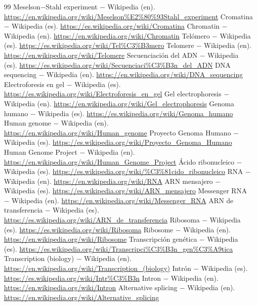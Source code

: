 \documentclass{book}
\begin{document}
\begin{thebibliography}{99}
 Meselson\(-\)Stahl experiment \(-\) Wikipedia (en). \url{https://en.wikipedia.org/wiki/Meselson%E2%80%93Stahl_experiment}
 Cromatina \(-\) Wikipedia (es). \url{https://es.wikipedia.org/wiki/Cromatina}
 Chromatin \(-\) Wikipedia (en). \url{https://en.wikipedia.org/wiki/Chromatin}
 Telómero \(-\) Wikipedia (es). \url{https://es.wikipedia.org/wiki/Tel%C3%B3mero}
 Telomere \(-\) Wikipedia (en). \url{https://en.wikipedia.org/wiki/Telomere}
 Secuenciación del ADN \(-\) Wikipedia (es). \url{https://es.wikipedia.org/wiki/Secuenciaci%C3%B3n_del_ADN}
 DNA sequencing \(-\) Wikipedia (en). \url{https://en.wikipedia.org/wiki/DNA_sequencing}
 Electroforesis en gel \(-\) Wikipedia (es). \url{https://es.wikipedia.org/wiki/Electroforesis_en_gel}
 Gel electrophoresis \(-\) Wikipedia (en). \url{https://en.wikipedia.org/wiki/Gel_electrophoresis}
 Genoma humano \(-\) Wikipedia (es). \url{https://es.wikipedia.org/wiki/Genoma_humano}
 Human genome \(-\) Wikipedia (en). \url{https://en.wikipedia.org/wiki/Human_genome}
 Proyecto Genoma Humano \(-\) Wikipedia (es). \url{https://es.wikipedia.org/wiki/Proyecto_Genoma_Humano}
 Human Genome Project \(-\) Wikipedia (en). \url{https://en.wikipedia.org/wiki/Human_Genome_Project}
 Ácido ribonucleico \(-\) Wikipedia (es). \url{https://es.wikipedia.org/wiki/%C3%81cido_ribonucleico}
 RNA \(-\) Wikipedia (en). \url{https://en.wikipedia.org/wiki/RNA}
 ARN mensajero \(-\) Wikipedia (es). \url{https://es.wikipedia.org/wiki/ARN_mensajero}
 Messenger RNA \(-\) Wikipedia (en). \url{https://en.wikipedia.org/wiki/Messenger_RNA}
 ARN de transferencia \(-\) Wikipedia (es). \url{https://es.wikipedia.org/wiki/ARN_de_transferencia}
 Ribosoma \(-\) Wikipedia (es). \url{https://es.wikipedia.org/wiki/Ribosoma}
 Ribosome \(-\) Wikipedia (en). \url{https://en.wikipedia.org/wiki/Ribosome}
 Transcripción genética \(-\) Wikipedia (es). \url{https://es.wikipedia.org/wiki/Transcripci%C3%B3n_gen%C3%A9tica}
 Transcription (biology) \(-\) Wikipedia (en). \url{https://en.wikipedia.org/wiki/Transcription_(biology)}
 Intrón \(-\) Wikipedia (es). \url{https://es.wikipedia.org/wiki/Intr%C3%B3n}
 Intron \(-\) Wikipedia (en). \url{https://en.wikipedia.org/wiki/Intron}
 Alternative splicing \(-\) Wikipedia (en). \url{https://en.wikipedia.org/wiki/Alternative_splicing}

\end{thebibliography}
\end{document}
